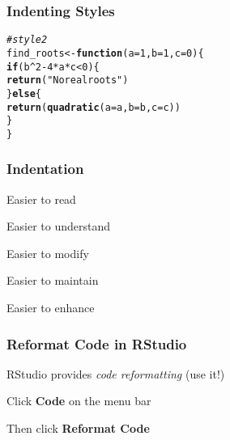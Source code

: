 \documentclass[12pt]{beamer}\usepackage[]{graphicx}\usepackage[]{color}
\makeatletter
\newcommand{\hlnum}[1]{\textcolor[rgb]{0.686,0.059,0.569}{#1}}%
\newcommand{\hlstr}[1]{\textcolor[rgb]{0.192,0.494,0.8}{#1}}%
\newcommand{\hlcom}[1]{\textcolor[rgb]{0.678,0.584,0.686}{\textit{#1}}}%
\newcommand{\hlopt}[1]{\textcolor[rgb]{0,0,0}{#1}}%
\newcommand{\hlstd}[1]{\textcolor[rgb]{0.345,0.345,0.345}{#1}}%
\newcommand{\hlkwa}[1]{\textcolor[rgb]{0.161,0.373,0.58}{\textbf{#1}}}%
\newcommand{\hlkwb}[1]{\textcolor[rgb]{0.69,0.353,0.396}{#1}}%
\newcommand{\hlkwc}[1]{\textcolor[rgb]{0.333,0.667,0.333}{#1}}%
\newcommand{\hlkwd}[1]{\textcolor[rgb]{0.737,0.353,0.396}{\textbf{#1}}}%
\newenvironment{kframe}{%
 \def\at@end@of@kframe{}%
 \ifinner\ifhmode%
  \def\at@end@of@kframe{\end{minipage}}%
  \begin{minipage}{\columnwidth}%
 \fi\fi%
 \def\FrameCommand##1{\hskip\@totalleftmargin \hskip-\fboxsep
 \colorbox{shadecolor}{##1}\hskip-\fboxsep
     \hskip-\linewidth \hskip-\@totalleftmargin \hskip\columnwidth}%
 \MakeFramed {\advance\hsize-\width
   \@totalleftmargin\z@ \linewidth\hsize
   \@setminipage}}%
 {\par\unskip\endMakeFramed%
 \at@end@of@kframe}
\newenvironment{knitrout}{}{} %
\makeatother
\begin{document}

\begin{frame}[fragile]
\frametitle{Indenting Styles}

\begin{knitrout}\footnotesize
{}\color{fgcolor}\begin{kframe}
\begin{alltt}
\hlcom{# style 2}
\hlstd{find_roots} \hlkwb{<-} \hlkwa{function}\hlstd{(}\hlkwc{a} \hlstd{=} \hlnum{1}\hlstd{,} \hlkwc{b} \hlstd{=} \hlnum{1}\hlstd{,} \hlkwc{c} \hlstd{=} \hlnum{0}\hlstd{) \{}
  \hlkwa{if} \hlstd{(b}\hlopt{^}\hlnum{2} \hlopt{-} \hlnum{4}\hlopt{*}\hlstd{a}\hlopt{*}\hlstd{c} \hlopt{<} \hlnum{0}\hlstd{) \{}
    \hlkwd{return}\hlstd{(}\hlstr{"No real roots"}\hlstd{)}
  \hlstd{\}} \hlkwa{else} \hlstd{\{}
    \hlkwd{return}\hlstd{(}\hlkwd{quadratic}\hlstd{(}\hlkwc{a} \hlstd{= a,} \hlkwc{b} \hlstd{= b,} \hlkwc{c} \hlstd{= c))}
  \hlstd{\}}
\hlstd{\}}
\end{alltt}
\end{kframe}
\end{knitrout}

\end{frame}


\begin{frame}[fragile]
\frametitle{Indentation}

\bi
  \item Easier to read
  \item Easier to understand
  \item Easier to modify
  \item Easier to maintain
  \item Easier to enhance
\ei
\eb

\end{frame}


\begin{frame}[fragile]
\frametitle{Reformat Code in RStudio}

\bi
  \item RStudio provides \textit{code reformatting} (use it!)
  \item Click \textbf{Code} on the menu bar
  \item Then click \textbf{Reformat Code}
\ei

\end{frame}
\end{document}
